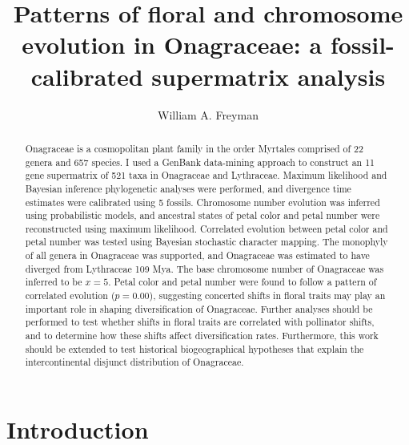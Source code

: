 \documentclass[review]{elsarticle}
\begin{document}
\begin{frontmatter}

\title{Patterns of floral and chromosome evolution in Onagraceae: a fossil-calibrated supermatrix analysis}

\author[berk]{William A. Freyman}

\address[berk]{Jepson Herbarium and Department of Integrative Biology, University of California, Berkeley}

\begin{abstract}
Onagraceae is a cosmopolitan plant family in the order Myrtales comprised of 22 genera and 657 species.
I used a GenBank data-mining approach to construct an 11 gene supermatrix of 521 taxa in Onagraceae and Lythraceae.
Maximum likelihood and Bayesian inference phylogenetic analyses were performed, 
and divergence time estimates were calibrated using 5 fossils.
Chromosome number evolution was inferred using probabilistic models,
and ancestral states of petal color and petal number were reconstructed using maximum likelihood.
Correlated evolution between petal color and petal number was tested using
Bayesian stochastic character mapping.
The monophyly of all genera in Onagraceae was supported,
and Onagraceae was estimated to have diverged from Lythraceae 109 Mya. 
The base chromosome number of Onagraceae was inferred to be $x=5$.
Petal color and petal number were found
to follow a pattern of correlated evolution ($p=0.00$), 
suggesting concerted shifts in floral traits may play an important role in shaping diversification of Onagraceae. 
Further analyses should be performed to test whether shifts in
floral traits are correlated with pollinator shifts,
and to determine how these shifts affect diversification rates.
Furthermore, this work should be extended to test historical biogeographical hypotheses
that explain the intercontinental disjunct distribution of Onagraceae.
\end{abstract}

\end{frontmatter}




\section{Introduction}
\end{document}
